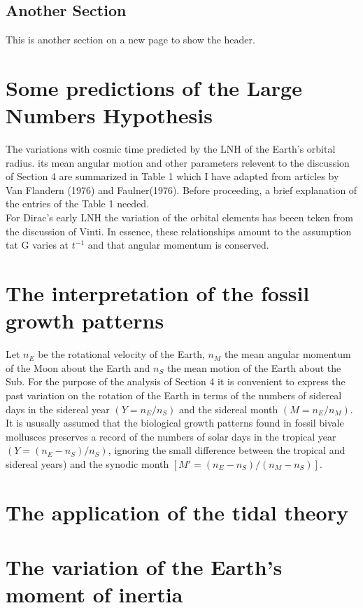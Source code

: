 \documentclass[master, copyright]{resources/class/ms_thesis}
\begin{document}
\section{Another Section}
This is another section on a new page to show the header.
\chapter{Some predictions of the Large Numbers Hypothesis}
The variations with cosmic time predicted by the LNH of the Earth's orbital radius. its mean
angular motion  and other parameters relevent to the discussion of Section 4 are summarized in Table 1 which I have adapted from articles by Van Flandern (1976) and Faulner(1976). Before proceeding, a brief explanation of the entries of the Table 1 needed. 
\newline \\
For Dirac's early LNH the variation of the orbital elements has beeen teken from the discussion of Vinti. In essence, these relationships amount to the assumption tat G varies at $t^{-1}$ and that angular momentum is conserved. 
\chapter{The interpretation of the fossil growth patterns}
Let $n_{E}$ be the rotational velocity of the Earth, $n_{M}$ the mean angular momentum of the Moon about the Earth and $n_{S}$ the mean motion of the Earth about the Sub. For the purpose of the analysis of Section 4 it is convenient to express the past variation on the rotation of the Earth in terms of the numbers of sidereal days in the sidereal year $(Y=n_{E}/n_{S})$ and the sidereal month $(M=n_{E}/n_{M})$.
\newline \\
It is ususally assumed that the biological growth patterns found in fossil bivale mollusces preserves a record of the numbers of solar days in the tropical  year $(Y=(n_{E}-n_{S})/n_{S})$, ignoring the small difference between the tropical and sidereal years) and the synodic month $[M'=(n_{E}-n_{S})/(n_{M}-n_{S})]$.
\newline \\
\chapter{The application of the tidal theory}

\chapter{The variation of the Earth's moment of inertia}
\end{document}
